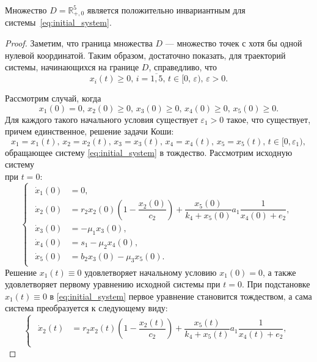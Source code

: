 \documentclass[14pt,a4paper]{extarticle}
\begin{document}
	\begin{theorem}
		Множество $D=\mathbb{R}^5_{+,0}$ является положительно инвариантным для системы~\ref{eq:initial_system}.
	\end{theorem}
	\begin{proof}
		Заметим, что граница множества $D$ --- множество точек с хотя бы одной нулевой координатой. Таким образом, достаточно показать, для траекторий системы, начинающихся на границе $D$, справедливо, что 
		\[x_i(t)\ge0,\, i=\overline{1,5},\, t\in[0,\,\varepsilon),\,\varepsilon>0.\]
		
		Рассмотрим случай, когда
		\begin{equation}\label{eq:conds_1}
			x_1(0)=0,\, x_2(0)\ge0,\, x_3(0)\ge0,\, x_4(0)\ge0,\, x_5(0)\ge0.
		\end{equation}
		Для каждого такого начального условия существует $\varepsilon_1>0$ такое, что существует, причем единственное, решение задачи Коши: 
		\begin{equation*}
			x_1=x_1(t),\, x_2=x_2(t),\, x_3=x_3(t),\, x_4=x_4(t),\, x_5=x_5(t),\, t\in[0,\varepsilon_1),
		\end{equation*}
		обращающее систему \ref{eq:initial_system} в тождество. Рассмотрим исходную систему\\ при \noindent$t=0$:
		\begin{equation*}
			\begin{cases}
				\begin{aligned}
					\dot{x}_1(0) &= 0,\\
					\dot{x}_2(0) &= r_2x_2(0)\left(1-\dfrac{x_2(0)}{c_2}\right)+\dfrac{x_5(0)}{k_4+x_5(0)}a_1\dfrac{1}{x_4(0)+e_2},\\
					\dot{x}_3(0) &= -\mu_1x_3(0),\\
					\dot{x}_4(0) &= s_1 - \mu_2x_4(0),\\
					\dot{x}_5(0) &= b_2x_3(0) - \mu_3x_5(0).
				\end{aligned}
			\end{cases}
		\end{equation*}
		Решение $x_1(t)\equiv0$ удовлетворяет начальному условию $x_1(0)=0$, а также удовлетворяет первому уравнению исходной системы при $t=0$. При подстановке $x_1(t)\equiv0$ в \ref{eq:initial_system} первое уравнение становится тождеством, а сама система преобразуется к следующему виду:
		\begin{equation*}
			\begin{cases}
				\begin{aligned}
					\dot{x}_2(t) &= r_2x_2(t)\left(1-\dfrac{x_2(t)}{c_2}\right)+\dfrac{x_5(t)}{k_4+x_5(t)}a_1\dfrac{1}{x_4(t)+e_2},\\

\end{aligned}
\end{cases}
\end{equation*}
\end{proof}
\end{document}
